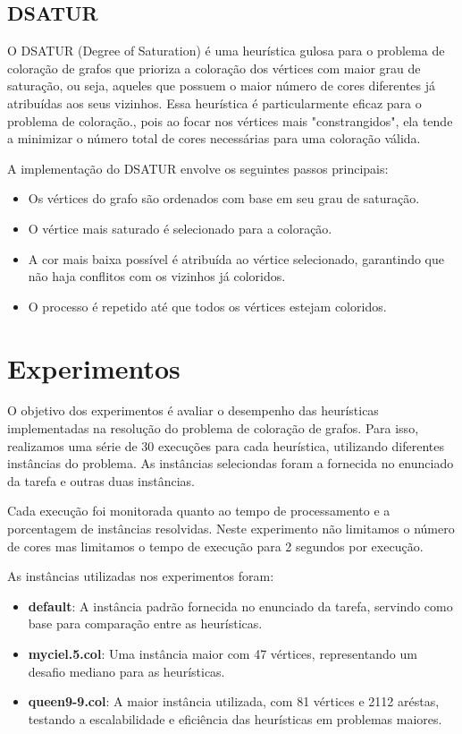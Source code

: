 \documentclass[12pt,a4paper]{article}
\begin{document}
\subsection{DSATUR}
O DSATUR (Degree of Saturation) é uma heurística gulosa para o problema de coloração de grafos que prioriza a coloração dos vértices com maior grau de saturação, ou seja, aqueles que possuem o maior número de cores diferentes já atribuídas aos seus vizinhos. Essa heurística é particularmente eficaz para o problema de coloração., pois ao focar nos vértices mais "constrangidos", ela tende a minimizar o número total de cores necessárias para uma coloração válida.

A implementação do DSATUR envolve os seguintes passos principais:
\begin{itemize}
 \item Os vértices do grafo são ordenados com base em seu grau de saturação.
 \item O vértice mais saturado é selecionado para a coloração.
 \item A cor mais baixa possível é atribuída ao vértice selecionado, garantindo que não haja conflitos com os vizinhos já coloridos.
 \item O processo é repetido até que todos os vértices estejam coloridos.
\end{itemize}

\section{Experimentos}
O objetivo dos experimentos é avaliar o desempenho das heurísticas implementadas na resolução do problema de coloração de grafos. Para isso, realizamos uma série de 30 execuções para cada heurística, utilizando diferentes instâncias do problema. As instâncias seleciondas foram a fornecida no enunciado da tarefa e outras duas instâncias.

Cada execução foi monitorada quanto ao tempo de processamento e a porcentagem de instâncias resolvidas. Neste experimento não limitamos o número de cores mas limitamos o tempo de execução para 2 segundos por execução.

As instâncias utilizadas nos experimentos foram:

\begin{itemize}
 \item \textbf{default}: A instância padrão fornecida no enunciado da tarefa, servindo como base para comparação entre as heurísticas.
 \item \textbf{myciel.5.col}: Uma instância maior com 47 vértices, representando um desafio mediano para as heurísticas.
 \item \textbf{queen9-9.col}: A maior instância utilizada, com 81 vértices e 2112 aréstas, testando a escalabilidade e eficiência das heurísticas em problemas maiores.
\end{itemize}
\end{document}
